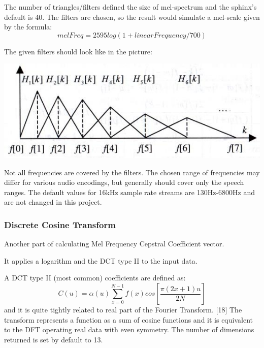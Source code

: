 \documentclass[12pt,a4paper,english]{article}
\begin{document}
The number of triangles/filters defined the size of mel-spectrum and the sphinx's default is 40. \newline
The filters are chosen, so the result would simulate a mel-scale given by the formula:
\begin{equation}
    melFreq = 2595 log(1 + linearFrequency / 700)
\end{equation}

The given filters should look like in the picture:
\begin{center}
    \includegraphics[scale=0.4]{mel_filters.jpg}
\end {center}

Not all frequencies are covered by the filters.
The chosen range of frequencies may differ for various audio encodings,
but generally should cover only the speech ranges.
The default values for 16kHz sample rate streams are 130Hz-6800Hz and are not changed in this project.

\newpage
\subsubsection{Discrete Cosine Transform}

Another part of calculating Mel Frequency Cepstral Coefficient vector.  \newline

It applies a logarithm and the DCT type II to the input data.  \newline

A DCT type II (most common) coefficients are defined as: 
\begin{equation}
    C(u) = \alpha(u)\sum_{x=0}^{N-1} f(x)cos[\frac{\pi(2x+1)u}{2N}] 
\end{equation}
and it is quite tightly related to real part of the Fourier Transform. [18]
The transform represents a function as a sum of cosine functions and it is equivalent to the DFT operating
real data with even symmetry. \newline
The number of dimensions returned is set by default to 13.
\end{document}
